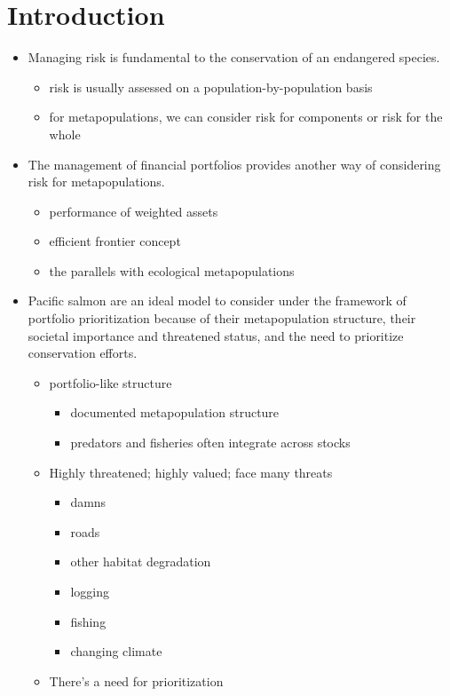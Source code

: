 \section{Introduction}

\begin{itemize}
\itemsep1pt\parskip0pt
\item
  Managing risk is fundamental to the conservation of an endangered
  species.

  \begin{itemize}
  \itemsep1pt\parskip0pt
  \item
    risk is usually assessed on a population-by-population basis
  \item
    for metapopulations, we can consider risk for components or risk for
    the whole
  \end{itemize}
\item
  The management of financial portfolios provides another way of
  considering risk for metapopulations.

  \begin{itemize}
  \itemsep1pt\parskip0pt
  \item
    performance of weighted assets
  \item
    efficient frontier concept
  \item
    the parallels with ecological metapopulations
  \end{itemize}
\item
  Pacific salmon are an ideal model to consider under the framework of
  portfolio prioritization because of their metapopulation structure,
  their societal importance and threatened status, and the need to
  prioritize conservation efforts.

  \begin{itemize}
  \itemsep1pt\parskip0pt
  \item
    portfolio-like structure

    \begin{itemize}
    \itemsep1pt\parskip0pt
    \item
      documented metapopulation structure
    \item
      predators and fisheries often integrate across stocks
    \end{itemize}
  \item
    Highly threatened; highly valued; face many threats

    \begin{itemize}
    \itemsep1pt\parskip0pt
    \item
      damns
    \item
      roads
    \item
      other habitat degradation
    \item
      logging
    \item
      fishing
    \item
      changing climate
    \end{itemize}
  \item
    There's a need for prioritization


\end{itemize}
\end{itemize}
